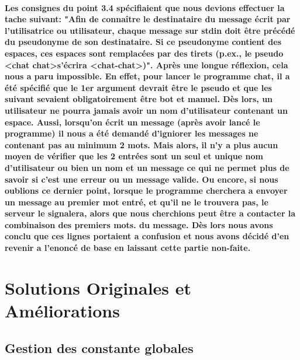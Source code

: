 \documentclass[utf8]{article}
\begin{document}
\paragraph{Les consignes du point 3.4 spécifiaient que nous devions effectuer la tache suivant: "Afin de connaître le
destinataire du message écrit par l’utilisatrice ou utilisateur, chaque message sur stdin doit
être précédé du pseudonyme de son destinataire. Si ce pseudonyme contient des espaces, ces
espaces sont remplacées par des tirets (p.ex., le pseudo \textless chat chat\textgreater s’écrira \textless chat-chat\textgreater)". 
Après une longue réflexion, cela nous a paru impossible. En effet, pour lancer le programme chat, 
il a été spécifié que le 1er argument devrait être le pseudo et que les suivant sevaient obligatoirement 
être bot et manuel. Dès lors, un utilisateur ne pourra jamais avoir un nom d'utilisateur contenant un espace. 
Aussi, lorsqu'on écrit un message (après avoir lancé le programme) il nous a été demandé d'igniorer les messages 
ne contenant pas au minimum 2 mots. Mais alors, il n'y a plus aucun moyen de vérifier que les 2 entrées sont un 
seul et unique nom d'utilisateur ou bien un nom et un message ce qui ne permet plus de savoir si c'est une erreur 
ou un message valide. Ou encore, si nous oublions ce dernier point, lorsque le programme cherchera a envoyer un message 
au premier mot entré, et qu'il ne le trouvera pas, le serveur le signalera, alors que nous cherchions peut être a contacter 
la combinaison des premiers mots. du message. Dès lors nous avons conclu que ces lignes portaient a confusion et nous avons 
décidé d'en revenir a l'enoncé de base en laissant cette partie non-faite.}

\section{Solutions Originales et Améliorations}
\subsection{Gestion des constante globales}
\end{document}
